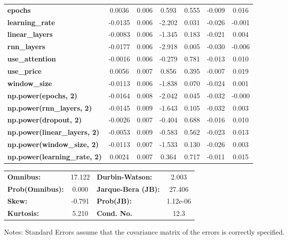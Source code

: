 \begin{center}
\begin{tabular}{lcccccc}
\textbf{epochs}                            &       0.0036  &        0.006     &     0.593  &         0.555        &       -0.009    &        0.016     \\
\textbf{learning\_rate}                    &      -0.0135  &        0.006     &    -2.202  &         0.031        &       -0.026    &       -0.001     \\
\textbf{linear\_layers}                    &      -0.0083  &        0.006     &    -1.345  &         0.183        &       -0.021    &        0.004     \\
\textbf{rnn\_layers}                       &      -0.0177  &        0.006     &    -2.918  &         0.005        &       -0.030    &       -0.006     \\
\textbf{use\_attention}                    &      -0.0016  &        0.006     &    -0.279  &         0.781        &       -0.013    &        0.010     \\
\textbf{use\_price}                        &       0.0056  &        0.007     &     0.856  &         0.395        &       -0.007    &        0.019     \\
\textbf{window\_size}                      &      -0.0113  &        0.006     &    -1.838  &         0.070        &       -0.024    &        0.001     \\
\textbf{np.power(epochs, 2)}               &      -0.0164  &        0.008     &    -2.042  &         0.045        &       -0.032    &       -0.000     \\
\textbf{np.power(rnn\_layers, 2)}          &      -0.0145  &        0.009     &    -1.643  &         0.105        &       -0.032    &        0.003     \\
\textbf{np.power(dropout, 2)}              &      -0.0026  &        0.007     &    -0.404  &         0.688        &       -0.016    &        0.010     \\
\textbf{np.power(linear\_layers, 2)}       &      -0.0053  &        0.009     &    -0.583  &         0.562        &       -0.023    &        0.013     \\
\textbf{np.power(window\_size, 2)}         &      -0.0113  &        0.007     &    -1.533  &         0.130        &       -0.026    &        0.003     \\
\textbf{np.power(learning\_rate, 2)}       &       0.0024  &        0.007     &     0.364  &         0.717        &       -0.011    &        0.015     \\
\bottomrule
\end{tabular}
\begin{tabular}{lclc}
\textbf{Omnibus:}       & 17.122 & \textbf{  Durbin-Watson:     } &    2.003  \\
\textbf{Prob(Omnibus):} &  0.000 & \textbf{  Jarque-Bera (JB):  } &   27.406  \\
\textbf{Skew:}          & -0.791 & \textbf{  Prob(JB):          } & 1.12e-06  \\
\textbf{Kurtosis:}      &  5.210 & \textbf{  Cond. No.          } &     12.3  \\
\bottomrule
\end{tabular}
\end{center}

Notes: \newline
 [1] Standard Errors assume that the covariance matrix of the errors is correctly specified.